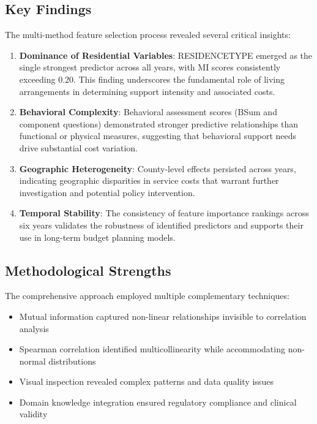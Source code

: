 \subsection{Key Findings}
\label{subsec:key-findings}

The multi-method feature selection process revealed several critical insights:

\begin{enumerate}
    \item \textbf{Dominance of Residential Variables}: RESIDENCETYPE emerged as the single strongest predictor across all years, with MI scores consistently exceeding 0.20. This finding underscores the fundamental role of living arrangements in determining support intensity and associated costs.
    
    \item \textbf{Behavioral Complexity}: Behavioral assessment scores (BSum and component questions) demonstrated stronger predictive relationships than functional or physical measures, suggesting that behavioral support needs drive substantial cost variation.
    
    \item \textbf{Geographic Heterogeneity}: County-level effects persisted across years, indicating geographic disparities in service costs that warrant further investigation and potential policy intervention.
    
    \item \textbf{Temporal Stability}: The consistency of feature importance rankings across six years validates the robustness of identified predictors and supports their use in long-term budget planning models.
\end{enumerate}

\subsection{Methodological Strengths}
\label{subsec:methodological-strengths}

The comprehensive approach employed multiple complementary techniques:

\begin{itemize}
    \item Mutual information captured non-linear relationships invisible to correlation analysis
    \item Spearman correlation identified multicollinearity while accommodating non-normal distributions
    \item Visual inspection revealed complex patterns and data quality issues
    \item Domain knowledge integration ensured regulatory compliance and clinical validity
\end{itemize}

